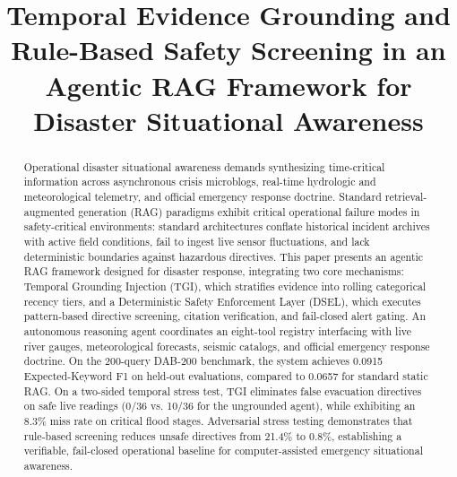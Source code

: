 \documentclass[conference]{IEEEtran}
\begin{document}
\title{Temporal Evidence Grounding and Rule-Based Safety Screening in an Agentic RAG Framework for Disaster Situational Awareness}

\author{
}

\maketitle

\begin{abstract}
Operational disaster situational awareness demands synthesizing time-critical information across asynchronous crisis microblogs, real-time hydrologic and meteorological telemetry, and official emergency response doctrine. Standard retrieval-augmented generation (RAG) paradigms exhibit critical operational failure modes in safety-critical environments: standard architectures conflate historical incident archives with active field conditions, fail to ingest live sensor fluctuations, and lack deterministic boundaries against hazardous directives. This paper presents an agentic RAG framework designed for disaster response, integrating two core mechanisms: Temporal Grounding Injection (TGI), which stratifies evidence into rolling categorical recency tiers, and a Deterministic Safety Enforcement Layer (DSEL), which executes pattern-based directive screening, citation verification, and fail-closed alert gating. An autonomous reasoning agent coordinates an eight-tool registry interfacing with live river gauges, meteorological forecasts, seismic catalogs, and official emergency response doctrine. On the 200-query DAB-200 benchmark, the system achieves 0.0915 Expected-Keyword F1 on held-out evaluations, compared to 0.0657 for standard static RAG. On a two-sided temporal stress test, TGI eliminates false evacuation directives on safe live readings (0/36 vs. 10/36 for the ungrounded agent), while exhibiting an 8.3\% miss rate on critical flood stages. Adversarial stress testing demonstrates that rule-based screening reduces unsafe directives from 21.4\% to 0.8\%, establishing a verifiable, fail-closed operational baseline for computer-assisted emergency situational awareness.
\end{abstract}
\end{document}
